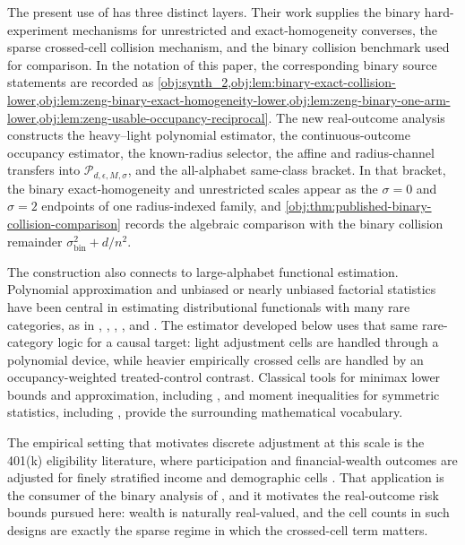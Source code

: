 \documentclass[11pt]{article}
\begin{document}
The present use of \citet{ZengBalakrishnanHanKennedy2024} has three distinct layers. Their work supplies the binary hard-experiment mechanisms for unrestricted and exact-homogeneity converses, the sparse crossed-cell collision mechanism, and the binary collision benchmark used for comparison. In the notation of this paper, the corresponding binary source statements are recorded as \cref{obj:synth_2,obj:lem:binary-exact-collision-lower,obj:lem:zeng-binary-exact-homogeneity-lower,obj:lem:zeng-binary-one-arm-lower,obj:lem:zeng-usable-occupancy-reciprocal}. The new real-outcome analysis constructs the heavy--light polynomial estimator, the continuous-outcome occupancy estimator, the known-radius selector, the affine and radius-channel transfers into \(\mathcal P_{d,\epsilon,M,\sigma}\), and the all-alphabet same-class bracket. In that bracket, the binary exact-homogeneity and unrestricted scales appear as the \(\sigma=0\) and \(\sigma=2\) endpoints of one radius-indexed family, and \cref{obj:thm:published-binary-collision-comparison} records the algebraic comparison with the binary collision remainder \(\sigma_{\mathrm{bin}}^2+d/n^2\).

The construction also connects to large-alphabet functional estimation. Polynomial approximation and unbiased or nearly unbiased factorial statistics have been central in estimating distributional functionals with many rare categories, as in \citet{Paninski2003}, \citet{Valiant2011a,Valiant2011b,Valiant2016,Valiant2017}, \citet{JiaoVenkatHanWeissman2015}, \citet{WuYang2016Entropy}, and \citet{Wu2019}. The estimator developed below uses that same rare-category logic for a causal target: light adjustment cells are handled through a polynomial device, while heavier empirically crossed cells are handled by an occupancy-weighted treated-control contrast. Classical tools for minimax lower bounds and approximation, including \citet{LeCam1986,Tsybakov2009,Cai2011,Donoho1990,Timan1963}, and moment inequalities for symmetric statistics, including \citet{Hoeffding1948,Serfling1980}, provide the surrounding mathematical vocabulary.

The empirical setting that motivates discrete adjustment at this scale is the 401(k) eligibility literature, where participation and financial-wealth outcomes are adjusted for finely stratified income and demographic cells \citep{Poterba1994,Poterba1995}. That application is the consumer of the binary analysis of \citet{ZengBalakrishnanHanKennedy2024}, and it motivates the real-outcome risk bounds pursued here: wealth is naturally real-valued, and the cell counts in such designs are exactly the sparse regime in which the crossed-cell term matters.
\end{document}
